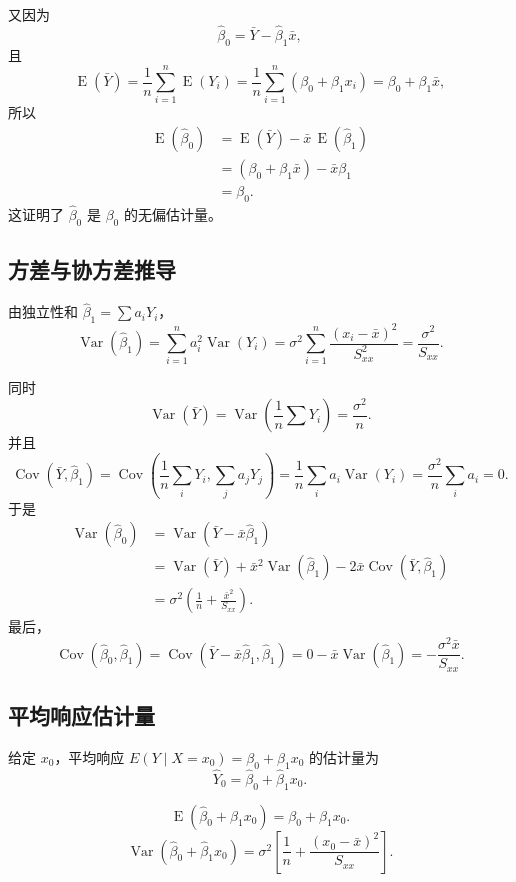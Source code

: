 \documentclass[11pt,a4paper]{article}
\theoremstyle{definition}
\theoremstyle{plain}
\theoremstyle{remark}
\newcommand{\E}{\operatorname{E}}
\newcommand{\Var}{\operatorname{Var}}
\newcommand{\Cov}{\operatorname{Cov}}
\begin{document}
又因为
\[
    \hat\beta_0=\bar Y-\hat\beta_1\bar x,
\]
且
\[
    \E(\bar Y)
    =
    \frac{1}{n}\sum_{i=1}^n\E(Y_i)
    =
    \frac{1}{n}\sum_{i=1}^n(\beta_0+\beta_1x_i)
    =
    \beta_0+\beta_1\bar x,
\]
所以
\begin{align}
    \E(\hat\beta_0)
    &=
    \E(\bar Y)-\bar x\,\E(\hat\beta_1)\\
    &=
    (\beta_0+\beta_1\bar x)-\bar x\beta_1\\
    &=
    \beta_0.
\end{align}
这证明了 $\hat\beta_0$ 是 $\beta_0$ 的无偏估计量。

\subsection{方差与协方差推导}

由独立性和 $\hat\beta_1=\sum a_iY_i$，
\[
    \Var(\hat\beta_1)
    =
    \sum_{i=1}^n a_i^2\Var(Y_i)
    =
    \sigma^2\sum_{i=1}^n\frac{(x_i-\bar x)^2}{S_{xx}^2}
    =
    \frac{\sigma^2}{S_{xx}}.
\]

同时
\[
    \Var(\bar Y)=\Var\left(\frac{1}{n}\sum Y_i\right)=\frac{\sigma^2}{n}.
\]
并且
\[
    \Cov(\bar Y,\hat\beta_1)
    =
    \Cov\left(\frac{1}{n}\sum_iY_i,\sum_j a_jY_j\right)
    =
    \frac{1}{n}\sum_i a_i\Var(Y_i)
    =
    \frac{\sigma^2}{n}\sum_i a_i=0.
\]
于是
\begin{align}
    \Var(\hat\beta_0)
    &=
    \Var(\bar Y-\bar x\hat\beta_1)\\
    &=
    \Var(\bar Y)+\bar x^2\Var(\hat\beta_1)-2\bar x\Cov(\bar Y,\hat\beta_1)\\
    &=
    \sigma^2\left(\frac{1}{n}+\frac{\bar x^2}{S_{xx}}\right).
\end{align}
最后，
\[
    \Cov(\hat\beta_0,\hat\beta_1)
    =
    \Cov(\bar Y-\bar x\hat\beta_1,\hat\beta_1)
    =
    0-\bar x\Var(\hat\beta_1)
    =
    -\frac{\sigma^2\bar x}{S_{xx}}.
\]

\subsection{平均响应估计量}

给定 $x_0$，平均响应 $E(Y\mid X=x_0)=\beta_0+\beta_1x_0$ 的估计量为
\[
    \hat Y_0=\hat\beta_0+\hat\beta_1x_0.
\]

\begin{memorybox}
\[
    \boxed{\E(\hat\beta_0+\hat\beta_1x_0)=\beta_0+\beta_1x_0.}
\]
\[
    \boxed{
    \Var(\hat\beta_0+\hat\beta_1x_0)
    =
    \sigma^2\left[
        \frac{1}{n}+\frac{(x_0-\bar x)^2}{S_{xx}}
    \right].
    }
\]
\end{memorybox}
\end{document}
